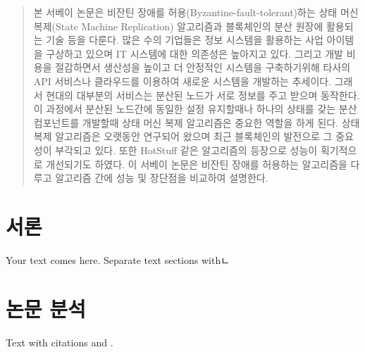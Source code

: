 
\date{Received: date / Accepted: date}


\maketitle

\renewcommand{\abstractname}{초록}
\begin{abstract}
본 서베이 논문은 비잔틴 장애를 허용(Byzantine-fault-tolerant)하는 
상태 머신 복제(State Machine Replication) 알고리즘과 블록체인의 분산 원장에 활용되는 기술 등을 다룬다. 
많은 수의 기업들은 정보 시스템을 활용하는 사업 아이템을 구상하고 있으며
IT 시스템에 대한 의존성은 높아지고 있다.
그리고 개발 비용을 절감하면서 생산성을 높이고 더 안정적인 시스템을 구축하기위해
타사의 API 서비스나 클라우드를 이용하여 새로운 시스템을 개발하는 추세이다.
그래서 현대의 대부분의 서비스는 분산된 노드가 서로 정보를 주고 받으며 동작한다.
이 과정에서 분산된 노드간에 동일한 설정 유지할때나 하나의 상태를 갖는 분산 컴포넌트를 개발할때
상태 머신 복제 알고리즘은 중요한 역할을 하게 된다.
상태 복제 알고리즘은 오랫동안 연구되어 왔으며 최근 블록체인의
발전으로 그 중요성이 부각되고 있다. 또한 HotStuff 같은 알고리즘의 등장으로 성능이 획기적으로
개선되기도 하였다. 이 서베이 논문은 비잔틴 장애를 허용하는 알고리즘을 다루고
알고리즘 간에 성능 및 장단점을 비교하여 설명한다.

\end{abstract}

\section{서론}
\label{intro}
Your text comes here. Separate text sections withㄴ
\section{논문 분석}
\label{sec:1}
Text with citations \cite{RefB} and \cite{RefJ}.
